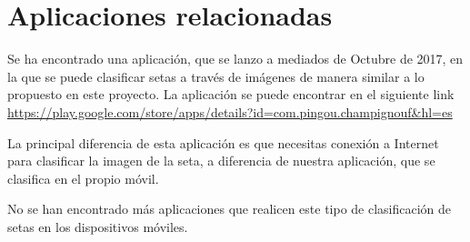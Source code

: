 \section{Aplicaciones relacionadas}

Se ha encontrado una aplicación, que se lanzo a mediados de Octubre de 2017, en la que se puede clasificar setas a través de imágenes de manera similar a lo propuesto en este proyecto. La aplicación se puede encontrar en el siguiente link \url{https://play.google.com/store/apps/details?id=com.pingou.champignouf&hl=es}

La principal diferencia de esta aplicación es que necesitas conexión a Internet para clasificar la imagen de la seta, a diferencia de nuestra aplicación, que se clasifica en el propio móvil.

No se han encontrado más aplicaciones que realicen este tipo de clasificación de setas en los dispositivos móviles.